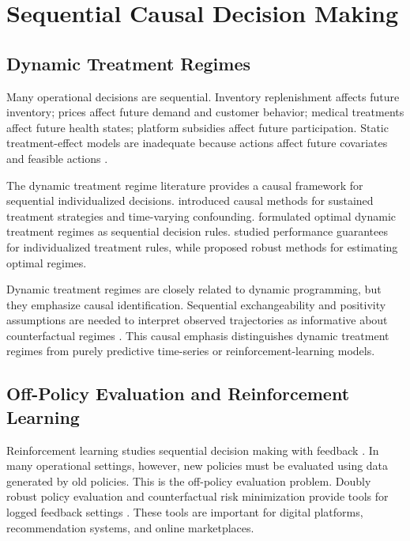 \documentclass[11pt]{article}
\begin{document}
\section{Sequential Causal Decision Making}
\label{sec:sequential}

\subsection{Dynamic Treatment Regimes}

Many operational decisions are sequential. Inventory replenishment affects future inventory; prices affect future demand and customer behavior; medical treatments affect future health states; platform subsidies affect future participation. Static treatment-effect models are inadequate because actions affect future covariates and feasible actions \citep{murphy2003dynamic,sutton2018reinforcement}.

The dynamic treatment regime literature provides a causal framework for sequential individualized decisions. \citet{robins1986new} introduced causal methods for sustained treatment strategies and time-varying confounding. \citet{murphy2003dynamic} formulated optimal dynamic treatment regimes as sequential decision rules. \citet{qian2011performance} studied performance guarantees for individualized treatment rules, while \citet{zhang2012robust} proposed robust methods for estimating optimal regimes.

Dynamic treatment regimes are closely related to dynamic programming, but they emphasize causal identification. Sequential exchangeability and positivity assumptions are needed to interpret observed trajectories as informative about counterfactual regimes \citep{hernan2020causal}. This causal emphasis distinguishes dynamic treatment regimes from purely predictive time-series or reinforcement-learning models.

\subsection{Off-Policy Evaluation and Reinforcement Learning}

Reinforcement learning studies sequential decision making with feedback \citep{sutton2018reinforcement}. In many operational settings, however, new policies must be evaluated using data generated by old policies. This is the off-policy evaluation problem. Doubly robust policy evaluation and counterfactual risk minimization provide tools for logged feedback settings \citep{dudik2011doubly,swaminathan2015counterfactual}. These tools are important for digital platforms, recommendation systems, and online marketplaces.
\end{document}
